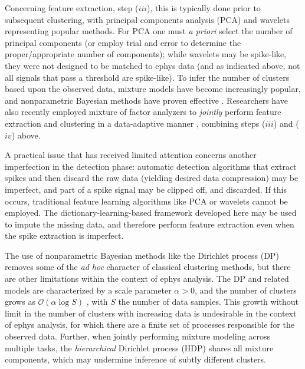 \documentclass[journal]{IEEEtran}
\begin{document}
Concerning feature extraction, step ($iii$), this is typically done prior to subsequent clustering, with principal components analysis (PCA) \cite{Lewicki} and wavelets \cite{Letelier2000} representing popular methods. For PCA one must \emph{a priori} select the number of principal components (or employ trial and error to determine the proper/appropriate number of components); while wavelets may be spike-like, they were not designed to be matched to ephys data (and as indicated above, not all signals that pass a threshold are spike-like). To infer the number of clusters based upon the observed data, mixture models have become increasingly popular, and nonparametric Bayesian methods have proven effective \cite{Wood2009,Bo2011}. Researchers have also recently employed mixture of factor analyzers to \emph{jointly} perform feature extraction and clustering in a data-adaptive manner \cite{Dilan,Bo2011}, combining steps ($iii$) and ($iv$) above.

A practical issue that has received limited attention concerns another imperfection in the detection phase: automatic detection algorithms that extract spikes and then discard the raw data (yielding desired data compression) may be imperfect, and part of a spike signal may be clipped off, and discarded. If this occurs, traditional feature learning algorithms like PCA or wavelets cannot be employed. The dictionary-learning-based framework developed here may be used to impute the missing data, and therefore perform feature extraction even when the spike extraction is imperfect.

The use of nonparametric Bayesian methods like the Dirichlet process (DP) \cite{Wood2009,Bo2011} removes some of the \emph{ad hoc} character of classical clustering methods, but there are other limitations within the context of ephys analysis. The DP and related models are characterized by a scale parameter $\alpha>0$, and the number of clusters grows as $\mathcal{O}(\alpha \log S)$ \cite{Teh2010a}, with $S$ the number of data samples. This growth without limit in the number of clusters with increasing data is undesirable in the context of ephys analysis, for which there are a finite set of processes responsible for the observed data. Further, when jointly performing mixture modeling across multiple tasks, the \emph{hierarchical} Dirichlet process (HDP) \cite{HDP} shares all mixture components, which may undermine inference of subtly different clusters.
\end{document}
